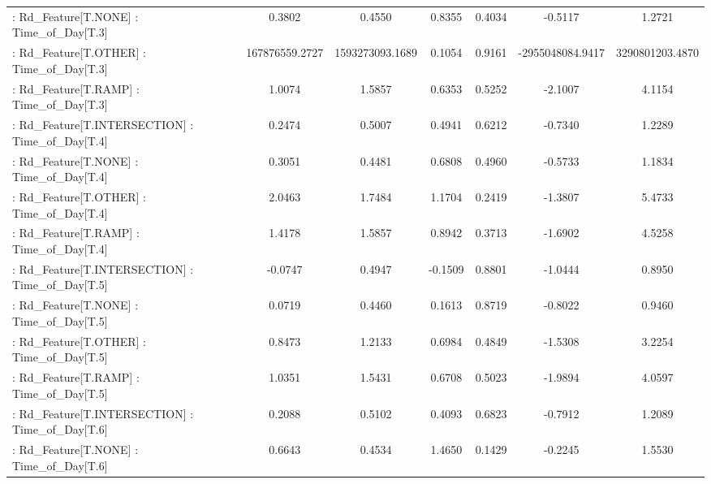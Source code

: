 \begin{longtable}{p{4cm}cccccc}
 : Rd\_Feature[T.NONE] : Time\_of\_Day[T.3]           &            0.3802 &            0.4550 &  0.8355 &       0.4034 &            -0.5117 &            1.2721 \\
 : Rd\_Feature[T.OTHER] : Time\_of\_Day[T.3]          &    167876559.2727 &   1593273093.1689 &  0.1054 &       0.9161 &   -2955048084.9417 &   3290801203.4870 \\
 : Rd\_Feature[T.RAMP] : Time\_of\_Day[T.3]           &            1.0074 &            1.5857 &  0.6353 &       0.5252 &            -2.1007 &            4.1154 \\
 : Rd\_Feature[T.INTERSECTION] : Time\_of\_Day[T.4]   &            0.2474 &            0.5007 &  0.4941 &       0.6212 &            -0.7340 &            1.2289 \\
 : Rd\_Feature[T.NONE] : Time\_of\_Day[T.4]           &            0.3051 &            0.4481 &  0.6808 &       0.4960 &            -0.5733 &            1.1834 \\
 : Rd\_Feature[T.OTHER] : Time\_of\_Day[T.4]          &            2.0463 &            1.7484 &  1.1704 &       0.2419 &            -1.3807 &            5.4733 \\
 : Rd\_Feature[T.RAMP] : Time\_of\_Day[T.4]           &            1.4178 &            1.5857 &  0.8942 &       0.3713 &            -1.6902 &            4.5258 \\
 : Rd\_Feature[T.INTERSECTION] : Time\_of\_Day[T.5]   &           -0.0747 &            0.4947 & -0.1509 &       0.8801 &            -1.0444 &            0.8950 \\
 : Rd\_Feature[T.NONE] : Time\_of\_Day[T.5]           &            0.0719 &            0.4460 &  0.1613 &       0.8719 &            -0.8022 &            0.9460 \\
 : Rd\_Feature[T.OTHER] : Time\_of\_Day[T.5]          &            0.8473 &            1.2133 &  0.6984 &       0.4849 &            -1.5308 &            3.2254 \\
 : Rd\_Feature[T.RAMP] : Time\_of\_Day[T.5]           &            1.0351 &            1.5431 &  0.6708 &       0.5023 &            -1.9894 &            4.0597 \\
 : Rd\_Feature[T.INTERSECTION] : Time\_of\_Day[T.6]   &            0.2088 &            0.5102 &  0.4093 &       0.6823 &            -0.7912 &            1.2089 \\
 : Rd\_Feature[T.NONE] : Time\_of\_Day[T.6]           &            0.6643 &            0.4534 &  1.4650 &       0.1429 &            -0.2245 &            1.5530 \\

\end{longtable}
